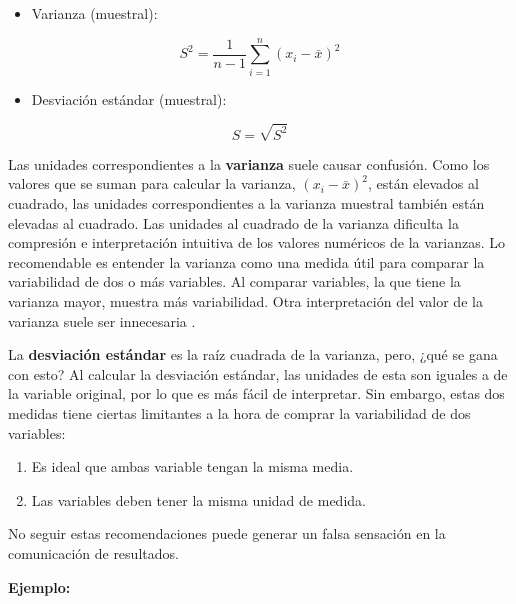 \documentclass[
]{book}
\providecommand{\tightlist}{%
  \setlength{\itemsep}{0pt}\setlength{\parskip}{0pt}}
\begin{document}
\begin{itemize}
\tightlist
\item
  Varianza (muestral):
\end{itemize}

\begin{equation}
S^2= \frac{1}{n-1}\sum_{i=1}^{n}(x_i-\bar{x})^2
\label{eq:varianzamuestral}
\end{equation}

\begin{itemize}
\tightlist
\item
  Desviación estándar (muestral):
\end{itemize}

\begin{equation}
S = \sqrt{S^2}
\label{eq:demuestral}
\end{equation}

Las unidades correspondientes a la \textbf{varianza} suele causar confusión. Como los valores que se suman para calcular la varianza, \((x_i-\bar{x})^2\), están elevados al cuadrado, las unidades correspondientes a la varianza muestral también están elevadas al cuadrado. Las unidades al cuadrado de la varianza dificulta la compresión e interpretación intuitiva de los valores numéricos de la varianzas. Lo recomendable es entender la varianza como una medida útil para comparar la variabilidad de dos o más variables. Al comparar variables, la que tiene la varianza mayor, muestra más variabilidad. Otra interpretación del valor de la varianza suele ser innecesaria \citep[página 94]{anderson}.

La \textbf{desviación estándar} es la raíz cuadrada de la varianza, pero, ¿qué se gana con esto? Al calcular la desviación estándar, las unidades de esta son iguales a de la variable original, por lo que es más fácil de interpretar. Sin embargo, estas dos medidas tiene ciertas limitantes a la hora de comprar la variabilidad de dos variables:

\begin{enumerate}
\def\labelenumi{\arabic{enumi}.}
\tightlist
\item
  Es ideal que ambas variable tengan la misma media.
\item
  Las variables deben tener la misma unidad de medida.
\end{enumerate}

No seguir estas recomendaciones puede generar un falsa sensación en la comunicación de resultados.

\textbf{Ejemplo:}
\end{document}
